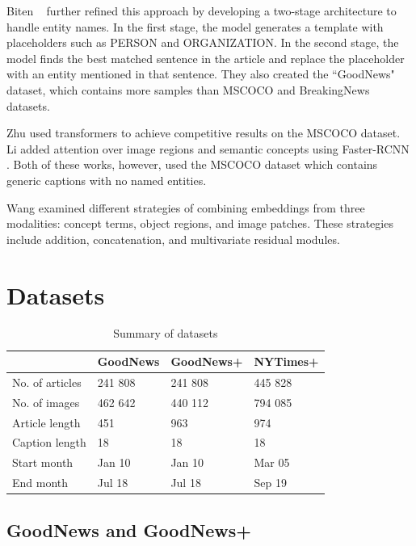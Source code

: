 \documentclass[10pt,twocolumn,letterpaper]{article}
\begin{document}
Biten \etal~\cite{Biten2019GoodNews} further refined this approach by
developing a two-stage architecture to handle entity names. In the first stage,
the model generates a template with placeholders such as PERSON and
ORGANIZATION. In the second stage, the model finds the best matched sentence in
the article and replace the placeholder with an entity mentioned in that
sentence. They also created the ``GoodNews" dataset, which contains more
samples than MSCOCO and BreakingNews
\cite{Ramisa2016BreakingNewsAA} datasets.

Zhu \etal \cite{Zhu2018CaptioningTW} used transformers to achieve competitive
results on the MSCOCO dataset. Li \etal \cite{Li2019Boosted} added attention
over image regions and semantic concepts using Faster-RCNN
\cite{Ren2015FasterRCNN}. Both of these works, however, used the MSCOCO dataset
which contains generic captions with no named entities.

Wang \etal \cite{Wang2019Hierarchical} examined different strategies of
combining embeddings from three modalities: concept terms, object regions,
and image patches. These strategies include addition, concatenation, and
multivariate residual modules.



\section{Datasets}

\begin{table}[t]
	\caption {Summary of datasets}
	\label{tab:datasets}
	\centering
	\begin{tabular}{llll}
		\toprule
		  & GoodNews  & GoodNews+ &   NYTimes+ \\
		\midrule
      No. of articles & 241 808 & 241 808 & 445 828 \\
      No. of images   & 462 642 & 440 112 & 794 085 \\
      Article length & 451 & 963 & 974 \\
      Caption length & 18 & 18 & 18 \\
      Start month & Jan 10 & Jan 10 & Mar 05\\
      End month & Jul 18 & Jul 18 & Sep 19 \\
		\bottomrule
	\end{tabular}
\end{table}

\subsection{GoodNews and GoodNews+}
\end{document}

